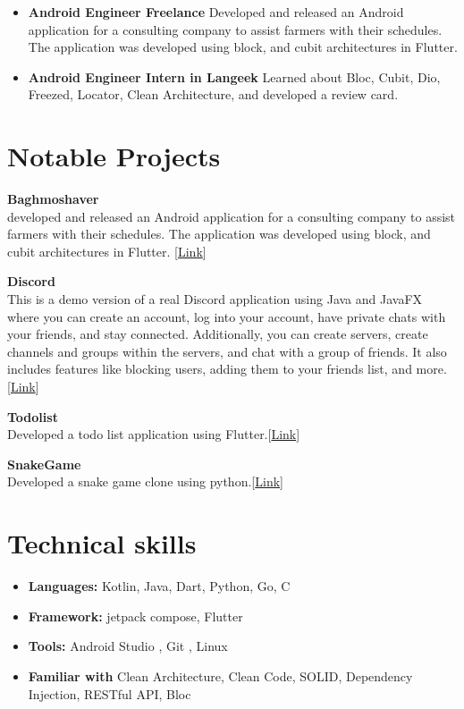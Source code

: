 \documentclass[a4paper,10pt]{article} %
\begin{document}
\begin{itemize}
    \item \textbf{Android Engineer Freelance } Developed and released an Android application for a consulting company to assist farmers with their schedules. The application was developed using block, and cubit architectures in Flutter. 
    \item \textbf{Android Engineer Intern in Langeek} Learned about Bloc, Cubit, Dio, Freezed, Locator, Clean Architecture, and developed a review card.
\end{itemize}


\section{Notable Projects}  

\begin{small}

\textbf{Baghmoshaver}\\
developed and released an Android application for a consulting company to assist farmers with their schedules. The application was developed using block, and cubit architectures in Flutter. [\href{https://cafebazaar.ir/app/com.example.bagh_moshaver}{Link}]
\end{small}

\textbf{Discord}\\
This is a demo version of a real Discord application using Java and JavaFX where you can create an account, log into
your account, have private chats with your friends, and stay connected. Additionally, you can
create servers, create channels and groups within the servers, and chat with a group of friends. It also
includes features like blocking users, adding them to your friends list, and more.
[\href{https://github.com/Aliamrol/Discord}{Link}]

\textbf{Todolist}\\
Developed a todo list application using Flutter.[\href{https://github.com/Aliamrol/Task_Manager}{Link}]

\textbf{SnakeGame}\\
Developed a snake game clone using python.[\href{https://github.com/Aliamrol/SnakeGame}{Link}]


\section{Technical skills} 

\begin{itemize}
    \item \textbf{Languages: } Kotlin, Java, Dart, Python, Go, C
    \item \textbf{Framework: } jetpack compose, Flutter
    \item \textbf{Tools: } Android Studio , Git , Linux
    \item \textbf{Familiar with} Clean Architecture, Clean Code, SOLID, Dependency Injection, RESTful API, Bloc
\end{itemize}
\end{document}
